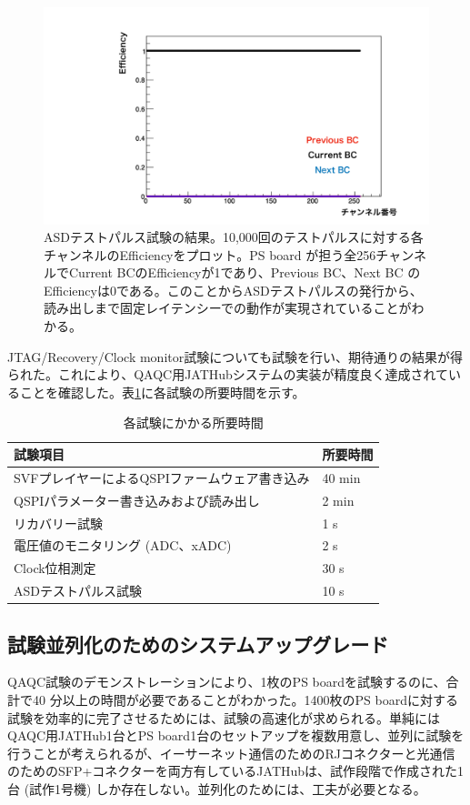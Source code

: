 \begin{figure} 
\centering
\includegraphics[width=16cm]{fig/QAQC/QAQCresult.pdf}
\caption[ASDテストパルスの結果]{ASDテストパルス試験の結果。10,000回のテストパルスに対する各チャンネルのEfficiencyをプロット。PS board が担う全256チャンネルでCurrent BCのEfficiencyが1であり、Previous BC、Next BC のEfficiencyは0である。このことからASDテストパルスの発行から、読み出しまで固定レイテンシーでの動作が実現されていることがわかる。}
\label{QAQCresult}
\end{figure}

JTAG/Recovery/Clock monitor試験についても試験を行い、期待通りの結果が得られた。これにより、QAQC用JATHubシステムの実装が精度良く達成されていることを確認した。表\ref{table_testtime}に各試験の所要時間を示す。

\begin{table}[]
    \centering
    \caption{各試験にかかる所要時間}
    \label{table_testtime}    
    \begin{tabular}{ll}
    \hline
    試験項目                          & 所要時間   \\ \hline
    SVFプレイヤーによるQSPIファームウェア書き込み    & 40 min \\
    QSPIパラメーター書き込みおよび読み出し         & 2 min  \\
    リカバリー試験                       & 1 s    \\
    電圧値のモニタリング (ADC、xADC) & 2 s    \\
    Clock位相測定                     & 30 s   \\
    ASDテストパルス試験                   & 10 s  
    \end{tabular}
\end{table}

\subsection{試験並列化のためのシステムアップグレード}
\label{subsec_parallel}
QAQC試験のデモンストレーションにより、1枚のPS boardを試験するのに、合計で40 分以上の時間が必要であることがわかった。1400枚のPS boardに対する試験を効率的に完了させるためには、試験の高速化が求められる。単純にはQAQC用JATHub1台とPS board1台のセットアップを複数用意し、並列に試験を行うことが考えられるが、イーサーネット通信のためのRJコネクターと光通信のためのSFP+コネクターを両方有しているJATHubは、試作段階で作成された1台 (試作1号機) しか存在しない。並列化のためには、工夫が必要となる。

